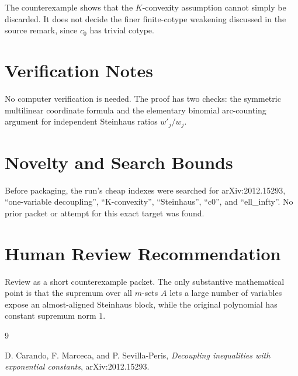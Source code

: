 \documentclass[11pt]{article}
\begin{document}
The counterexample shows that the \(K\)-convexity assumption cannot simply be
discarded. It does not decide the finer finite-cotype weakening discussed in
the source remark, since \(c_0\) has trivial cotype.

\section*{Verification Notes}

No computer verification is needed. The proof has two checks: the symmetric
multilinear coordinate formula and the elementary binomial arc-counting
argument for independent Steinhaus ratios \(w'_j/w_j\).

\section*{Novelty and Search Bounds}

Before packaging, the run's cheap indexes were searched for arXiv:2012.15293,
``one-variable decoupling'', ``K-convexity'', ``Steinhaus'', ``c0'', and
``ell\_infty''. No prior packet or attempt for this exact target was found.

\section*{Human Review Recommendation}

Review as a short counterexample packet. The only substantive mathematical
point is that the supremum over all \(m\)-sets \(A\) lets a large number of
variables expose an almost-aligned Steinhaus block, while the original
polynomial has constant supremum norm \(1\).

\begin{thebibliography}{9}

D. Carando, F. Marceca, and P. Sevilla-Peris,
\emph{Decoupling inequalities with exponential constants},
arXiv:2012.15293.

\end{thebibliography}
\end{document}
